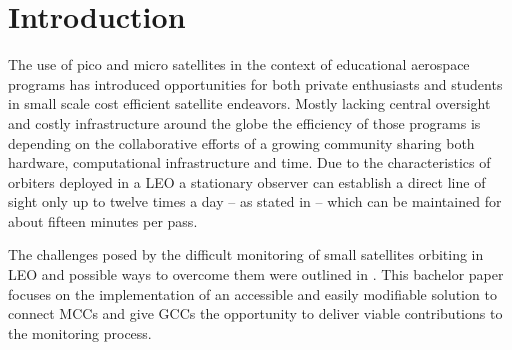 \documentclass[BachelorPaper]{subfiles}
\begin{document}
\chapter{Introduction}
The use of pico and micro satellites in the context of educational aerospace programs has introduced opportunities for both private enthusiasts and students in small scale cost efficient satellite endeavors. Mostly lacking central oversight and costly infrastructure around the globe the efficiency of those programs is depending on the collaborative efforts of a growing community sharing both hardware, computational infrastructure and time. Due to the characteristics of orbiters deployed in a \ac{LEO} a stationary observer  can establish a direct line of sight only up to twelve times a day -- as stated in \cite{kief_genso_2011} -- which can be maintained for about fifteen minutes per pass.

The challenges posed by the difficult monitoring of small satellites orbiting in \ac{LEO} and possible ways to overcome them were outlined in \cite{beyerle_boinso_2014}. This bachelor paper focuses on the implementation of an accessible and easily modifiable solution to connect \acp{MCC} and give \acp{GCC} the opportunity to deliver viable contributions to the monitoring process.
\end{document}
